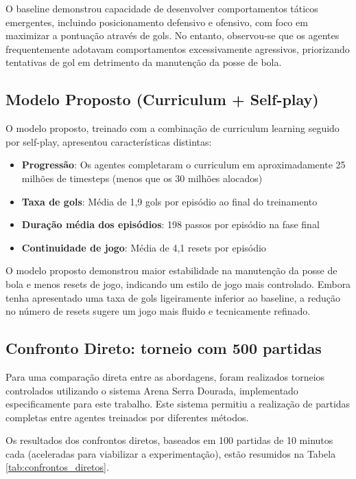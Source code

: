 O baseline demonstrou capacidade de desenvolver comportamentos táticos emergentes, incluindo posicionamento defensivo e ofensivo, com foco em maximizar a pontuação através de gols. No entanto, observou-se que os agentes frequentemente adotavam comportamentos excessivamente agressivos, priorizando tentativas de gol em detrimento da manutenção da posse de bola.

\subsection{Modelo Proposto (Curriculum + Self-play)}

O modelo proposto, treinado com a combinação de curriculum learning seguido por self-play, apresentou características distintas:

\begin{itemize}
    \item \textbf{Progressão}: Os agentes completaram o curriculum em aproximadamente 25 milhões de timesteps (menos que os 30 milhões alocados)
    \item \textbf{Taxa de gols}: Média de 1,9 gols por episódio ao final do treinamento
    \item \textbf{Duração média dos episódios}: 198 passos por episódio na fase final
    \item \textbf{Continuidade de jogo}: Média de 4,1 resets por episódio
\end{itemize}

O modelo proposto demonstrou maior estabilidade na manutenção da posse de bola e menos resets de jogo, indicando um estilo de jogo mais controlado. Embora tenha apresentado uma taxa de gols ligeiramente inferior ao baseline, a redução no número de resets sugere um jogo mais fluido e tecnicamente refinado.

\subsection{Confronto Direto: torneio com 500 partidas}

Para uma comparação direta entre as abordagens, foram realizados torneios controlados utilizando o sistema Arena Serra Dourada, implementado especificamente para este trabalho. Este sistema permitiu a realização de partidas completas entre agentes treinados por diferentes métodos.

Os resultados dos confrontos diretos, baseados em 100 partidas de 10 minutos cada (aceleradas para viabilizar a experimentação), estão resumidos na Tabela \ref{tab:confrontos_diretos}.

